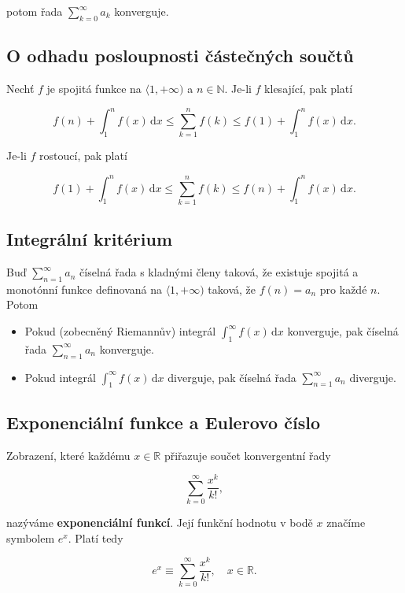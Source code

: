 \noindent potom řada $\displaystyle\sum_{k=0}^\infty a_k$ konverguje.

\subsection*{O odhadu posloupnosti částečných součtů}

Nechť $f$ je spojitá funkce na $\langle 1,+\infty)$ a $n\in\mathbb{N}$. Je-li
$f$ klesající, pak platí

\[ f(n) + \int_1^n f(x) \,\mathrm{d} x \leq \sum_{k=1}^n f(k) \leq f(1) + \int_1^n f(x) \,\mathrm{d}x. \]

\noindent Je-li $f$ rostoucí, pak platí

\[ f(1) + \int_1^n f(x) \,\mathrm{d} x \leq \sum_{k=1}^n f(k) \leq f(n) + \int_1^n f(x) \,\mathrm{d}x. \]

\subsection*{Integrální kritérium}

Buď $\displaystyle\sum_{n=1}^\infty a_n$ číselná řada s kladnými členy taková,
že existuje spojitá a monotónní funkce definovaná na $\langle 1,+\infty)$
taková, že $f(n) = a_n$ pro každé $n$. Potom

\begin{itemize}
    \item Pokud (zobecněný Riemannův) integrál $\displaystyle\int_1^\infty
              f(x)\,\mathrm{d}x$ konverguje, pak číselná řada $\displaystyle\sum_{n=1}^\infty
              a_n$ konverguje.
    \item Pokud integrál $\displaystyle\int_1^\infty f(x)\,\mathrm{d}x$ diverguje, pak
          číselná řada $\displaystyle\sum_{n=1}^\infty a_n$ diverguje.
\end{itemize}

\subsection*{Exponenciální funkce a Eulerovo číslo}

Zobrazení, které každému $x\in\mathbb{R}$ přiřazuje součet konvergentní řady

\[ \sum_{k=0}^\infty \frac{x^k}{k!}, \]

\noindent nazýváme \textbf{exponenciální funkcí}. Její funkční hodnotu v bodě $x$
značíme symbolem $e^x$. Platí tedy

\[ e^x \equiv \sum_{k=0}^\infty \frac{x^k}{k!}, \quad x\in\mathbb{R}. \]

